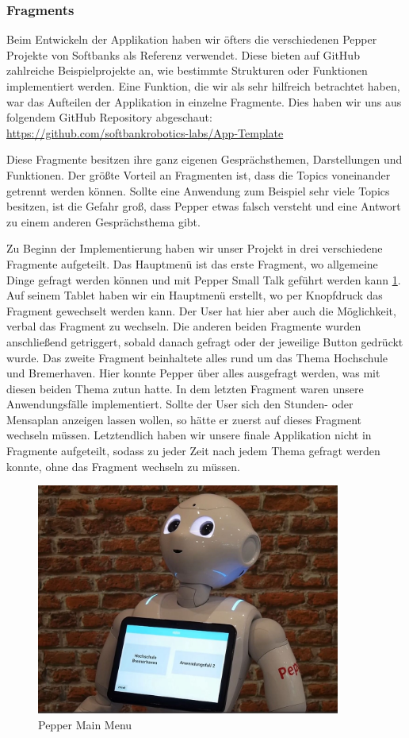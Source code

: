 \subsubsection{Fragments} 

Beim Entwickeln der Applikation haben wir öfters die verschiedenen Pepper Projekte von Softbanks als Referenz verwendet. Diese bieten auf 
GitHub zahlreiche Beispielprojekte an, wie bestimmte Strukturen oder Funktionen implementiert werden. 
Eine Funktion, die wir als sehr hilfreich betrachtet haben, war das Aufteilen der Applikation in einzelne Fragmente. Dies haben wir uns aus 
folgendem GitHub Repository abgeschaut:\\
\url{https://github.com/softbankrobotics-labs/App-Template}

Diese Fragmente besitzen ihre ganz eigenen Gesprächsthemen, Darstellungen und Funktionen. Der größte Vorteil an Fragmenten ist, dass die Topics 
voneinander getrennt werden können. Sollte eine Anwendung zum Beispiel sehr viele Topics besitzen, ist die Gefahr groß, dass Pepper etwas falsch 
versteht und eine Antwort zu einem anderen Gesprächsthema gibt.

Zu Beginn der Implementierung haben wir unser Projekt in drei verschiedene Fragmente aufgeteilt. Das Hauptmenü ist das erste Fragment, wo 
allgemeine Dinge gefragt werden können und mit Pepper Small Talk geführt werden kann \ref{fig:Mainmenu}. Auf seinem Tablet haben wir ein Hauptmenü erstellt, 
wo per Knopfdruck das Fragment gewechselt werden kann. Der User hat hier aber auch die Möglichkeit, verbal das Fragment zu wechseln.
Die anderen beiden Fragmente wurden anschließend getriggert, sobald danach gefragt oder der jeweilige Button gedrückt wurde. 
Das zweite Fragment beinhaltete alles rund um das Thema Hochschule und Bremerhaven. Hier konnte Pepper über alles ausgefragt werden, was mit 
diesen beiden Thema zutun hatte. In dem letzten Fragment waren unsere Anwendungsfälle implementiert. Sollte der User sich den Stunden- oder 
Mensaplan anzeigen lassen wollen, so hätte er zuerst auf dieses Fragment wechseln müssen. 
Letztendlich haben wir unsere finale Applikation nicht in Fragmente aufgeteilt, sodass zu jeder Zeit nach jedem Thema gefragt werden konnte, 
ohne das Fragment wechseln zu müssen.

\begin{figure}[H]
    \centering
    \includegraphics[width=10cm]{Figures/AppChapter/rx1.JPG}
    \caption{Pepper Main Menu}
    \label{fig:Mainmenu}
    \centering
\end{figure}

